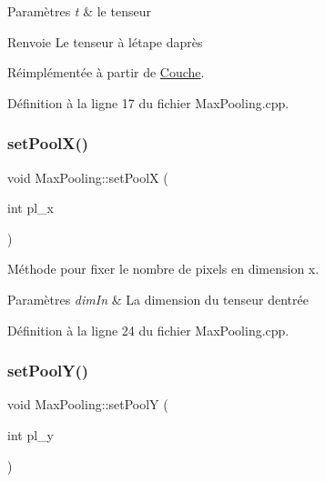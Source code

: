 \begin{DoxyParams}{Paramètres}
{\em t} & le tenseur \\
\hline
\end{DoxyParams}
\begin{DoxyReturn}{Renvoie}
Le tenseur à l\textquotesingle{}étape d\textquotesingle{}après 
\end{DoxyReturn}


Réimplémentée à partir de \hyperlink{class_couche_a1f0ed59e21020f5d4f37933af4d1b1e5}{Couche}.



Définition à la ligne 17 du fichier Max\+Pooling.\+cpp.

\mbox{\label{class_max_pooling_ae70dd14b2ebe5963b3a6904ca86857bc}} 
\subsubsection{\texorpdfstring{set\+Pool\+X()}{setPoolX()}}
{\footnotesize\ttfamily void Max\+Pooling\+::set\+PoolX (\begin{DoxyParamCaption}\item[{int}]{pl\+\_\+x }\end{DoxyParamCaption})}



Méthode pour fixer le nombre de pixels en dimension x. 


\begin{DoxyParams}{Paramètres}
{\em dim\+In} & La dimension du tenseur d\textquotesingle{}entrée \\
\hline
\end{DoxyParams}


Définition à la ligne 24 du fichier Max\+Pooling.\+cpp.

\mbox{\label{class_max_pooling_abf21b8f9da67780af60a588a543f7a1b}} 
\subsubsection{\texorpdfstring{set\+Pool\+Y()}{setPoolY()}}
{\footnotesize\ttfamily void Max\+Pooling\+::set\+PoolY (\begin{DoxyParamCaption}\item[{int}]{pl\+\_\+y }\end{DoxyParamCaption})}



